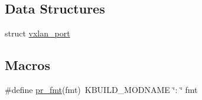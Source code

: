 \subsection*{Data Structures}
\begin{DoxyCompactItemize}
\item 
struct \hyperlink{structvxlan__port}{vxlan\+\_\+port}
\end{DoxyCompactItemize}
\subsection*{Macros}
\begin{DoxyCompactItemize}
\item 
\#define \hyperlink{linux_2vport-vxlan_8c_a1f8c165bf4196327bc3abff648276d92}{pr\+\_\+fmt}(fmt)~K\+B\+U\+I\+L\+D\+\_\+\+M\+O\+D\+N\+A\+M\+E \char`\"{}\+: \char`\"{} fmt
\end{DoxyCompactItemize}
